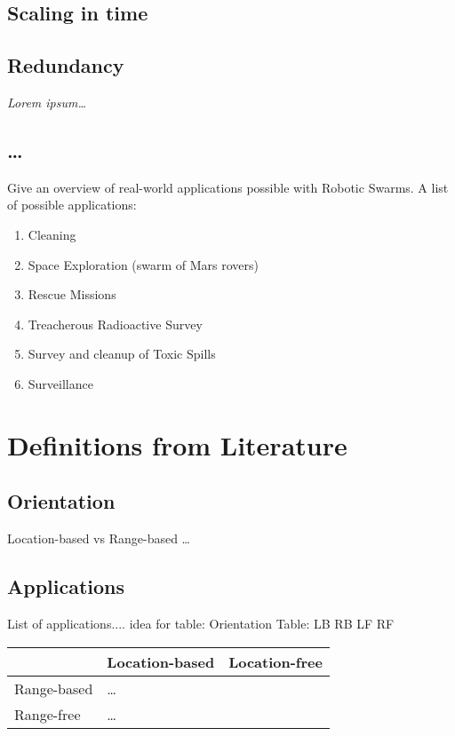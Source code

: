 \documentclass[a4paper]{article}
\begin{document}
  \subsection{Scaling in time}
  \subsection{Redundancy}
  
  \emph{Lorem ipsum\ldots}

  \subsection{\ldots}
  Give an overview of real-world applications possible with Robotic Swarms. A list of possible applications:
  \begin{enumerate}
    \item Cleaning
    \item Space Exploration (swarm of Mars rovers)
    \item Rescue Missions
    \item Treacherous Radioactive Survey
    \item Survey and cleanup of Toxic Spills
    \item Surveillance
  \end{enumerate}

\section{Definitions from Literature}

  \subsection{Orientation}
  Location-based vs Range-based \ldots
  \subsection{Applications}
  List of applications.... idea for table: Orientation Table: LB RB LF RF\\
  
  \begin{tabular}{|p{3cm}|p{3cm}|p{3cm}|}
    \hline
     & Location-based & Location-free\\\hline
    Range-based & \ldots & \\\hline
    Range-free & \ldots & \\
    \hline
  \end{tabular}
  
\end{document}
